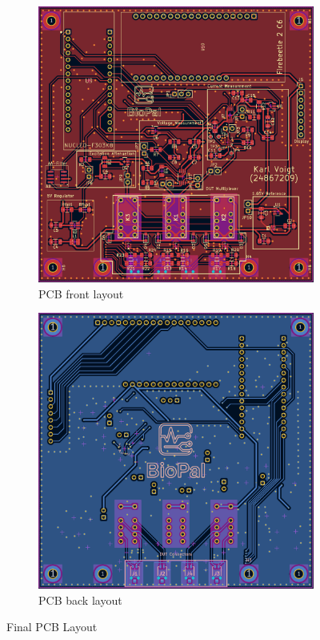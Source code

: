 \begin{figure}[H]
    \centering
    \begin{subfigure}[b]{0.48\textwidth}
        \centering
        \includegraphics[width=\textwidth]{BioPal_Front.png}
        \caption{PCB front layout}
        \label{fig:pcb_front}
    \end{subfigure}\hfill
    \begin{subfigure}[b]{0.48\textwidth}
        \centering
        \includegraphics[width=\textwidth]{BioPal_Back.png}
        \caption{PCB back layout}
        \label{fig:pcb_back}
    \end{subfigure}
    \caption{Final PCB Layout}
    \label{fig:pcb_layout}
\end{figure}

